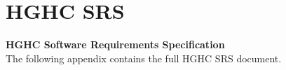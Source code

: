 \chapter{HGHC SRS}
\label{appendix:hghc}

\vspace*{\fill}
\begin{center}
    \textbf{HGHC Software Requirements Specification}\\[2em]
    The following appendix contains the full HGHC SRS document.
\end{center}
\vspace*{\fill}
\clearpage


